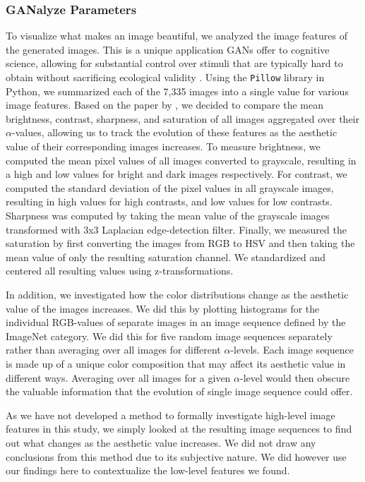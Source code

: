 \documentclass[../main.tex]{subfiles}
\begin{document}
	\subsubsection{GANalyze Parameters}
	To visualize what makes an image beautiful, we analyzed the image features of the generated images. This is a unique application GANs offer to cognitive science, allowing for substantial control over stimuli that are typically hard to obtain without sacrificing ecological validity \parencite{goetschalckx2021generative}. Using the \texttt{Pillow} library \parencite{clark2015pillow} in Python, we summarized each of the 7,335 images into a single value for various image features. Based on the paper by \textcite{ke2006design}, we decided to compare the mean brightness, contrast, sharpness, and saturation of all images aggregated over their $\alpha$-values, allowing us to track the evolution of these features as the aesthetic value of their corresponding images increases. To measure brightness, we computed the mean pixel values of all images converted to grayscale, resulting in a high and low values for bright and dark images respectively. For contrast, we computed the standard deviation of the pixel values in all grayscale images, resulting in high values for high contrasts, and low values for low contrasts. Sharpness was computed by taking the mean value of the grayscale images transformed with 3x3 Laplacian edge-detection filter. Finally, we measured the saturation by first converting the images from RGB to HSV and then taking the mean value of only the resulting saturation channel. We standardized and centered all resulting values using z-transformations.
		
	In addition, we investigated how the color distributions change as the aesthetic value of the images increases. We did this by plotting histograms for the individual RGB-values of separate images in an image sequence defined by the ImageNet category. We did this for five random image sequences separately rather than averaging over all images for different $\alpha$-levels. Each image sequence is made up of a unique color composition that may affect its aesthetic value in different ways. Averaging over all images for a given $\alpha$-level would then obscure the valuable information that the evolution of single image sequence could offer.
	
	As we have not developed a method to formally investigate high-level image features in this study, we simply looked at the resulting image sequences to find out what changes as the aesthetic value increases. We did not draw any conclusions from this method due to its subjective nature. We did however use our findings here to contextualize the low-level features we found.
\end{document}
